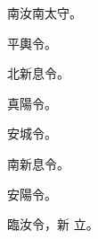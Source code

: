 \begin{pinyinscope}
南汝南太守。



 平輿令。



 北新息令。



 真陽令。



 安城令。



 南新息令。


安陽令。



 臨汝令，新
 立。



\end{pinyinscope}